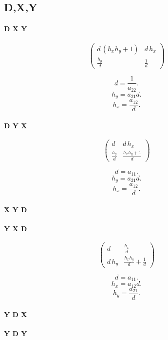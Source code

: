 \subsection{D,X,Y}

\paragraph{D X Y}

\[\begin{pmatrix}d\, \left( {h_x} {h_y}+1\right)  & d\, {h_x}\\
\frac{{h_y}}{d} & \frac{1}{d}\end{pmatrix}\]

$$d = \frac{1}{a_{22}}.$$
$$h_y = a_{21} d.$$
$$h_x = \frac{a_{12}}{d}.$$

\paragraph{D Y X}

\[\begin{pmatrix}d & d\, {h_x}\\
\frac{{h_y}}{d} & \frac{{h_x} {h_y}+1}{d}\end{pmatrix}\]

$$d = a_{11}.$$
$$h_y = a_{21} d.$$
$$h_x = \frac{a_{12}}{d}.$$

\paragraph{X Y D}



\paragraph{Y X D}

\[\begin{pmatrix}d & \frac{{h_x}}{d}\\
d\, {h_y} & \frac{{h_x} {h_y}}{d}+\frac{1}{d}\end{pmatrix}\]

$$d = a_{11}.$$
$$h_x = a_{12} d.$$
$$h_y = \frac{a_{21}}{d}.$$

\paragraph{Y D X}
\paragraph{Y D Y}